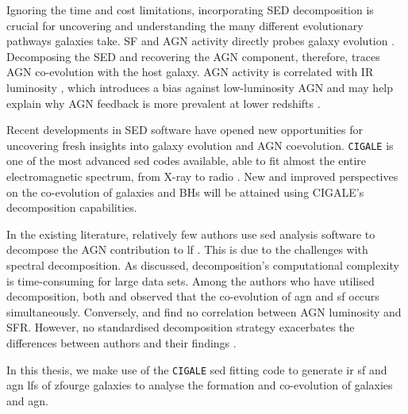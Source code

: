 Ignoring the time and cost limitations, incorporating SED decomposition is crucial for uncovering and understanding the many different evolutionary pathways galaxies take. SF and AGN activity directly probes galaxy evolution \citep{huang_local_2007, ho_spectral_1999, silva_modelling_2011, gruppioni_modelling_2011}. Decomposing the SED and recovering the AGN component, therefore, traces AGN co-evolution with the host galaxy. AGN activity is correlated with IR luminosity \citep{wu_mid-infrared_2011, symeonidis_what_2019, kauffmann_host_2003, symeonidis_agn_2021}, which introduces a bias against low-luminosity AGN and may help explain why AGN feedback is more prevalent at lower redshifts \citep{katsianis_evolution_2017, pouliasis_obscured_2020}.

Recent developments in SED software have opened new opportunities for uncovering fresh insights into galaxy evolution and AGN coevolution. \texttt{CIGALE} \citep{boquien_cigale_2019} is one of the most advanced \gls{sed} codes available, able to fit almost the entire electromagnetic spectrum, from X-ray \citep{yang_x-cigale_2020} to radio \citep{yang_fitting_2022}. New and improved perspectives on the co-evolution of galaxies and BHs will be attained using CIGALE's decomposition capabilities. 

In the existing literature, relatively few authors use \gls{sed} analysis software to decompose the AGN contribution to \gls{lf} \citep{stanley_remarkably_2015, hernan-caballero_resolving_2015, fu_decomposing_2010, gruppioni_modelling_2011, brown_infrared_2019, valiante_backward_2009}. This is due to the challenges with spectral decomposition. As \cite{silva_modelling_2011} discussed, decomposition's computational complexity is time-consuming for large data sets. Among the authors who have utilised decomposition, both \cite{fu_decomposing_2010} and \cite{brown_infrared_2019} observed that the co-evolution of \gls{agn} and \gls{sf} occurs simultaneously. Conversely, \cite{stanley_remarkably_2015} and \cite{cowley_decoupled_2018} find no correlation between AGN luminosity and SFR. However, no standardised decomposition strategy exacerbates the differences between authors and their findings \citep{wu_mid-infrared_2011}. 

In this thesis, we make use of the \texttt{CIGALE} \citep{boquien_cigale_2019} \gls{sed} fitting code to generate \gls{ir} \gls{sf} and \gls{agn} \gls{lf}s of \gls{zfourge} \citep{straatman_fourstar_2016} galaxies to analyse the formation and co-evolution of galaxies and \gls{agn}. 

